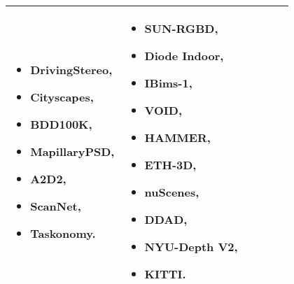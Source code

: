 \begin{table}[H]
{\begin{tabular}{ |l|p{2cm}|p{2cm}|p{5cm}|p{5cm}|r| }
\begin{itemize}
        \item DrivingStereo,
        \item Cityscapes,
        \item BDD100K,
        \item MapillaryPSD,
        \item A2D2,
        \item ScanNet,
        \item Taskonomy.
        \end{itemize} & 
        \begin{itemize} 
            \item SUN-RGBD,
            \item Diode Indoor,
            \item IBims-1,
            \item VOID,
            \item HAMMER,
            \item ETH-3D,
            \item nuScenes,
            \item DDAD,
            \item NYU-Depth V2,
            \item KITTI.
        \end{itemize}\\
        \hline
        \end{tabular}%
    }
    \label{tabela_podsumowanie_algorytmy}
\end{table}

